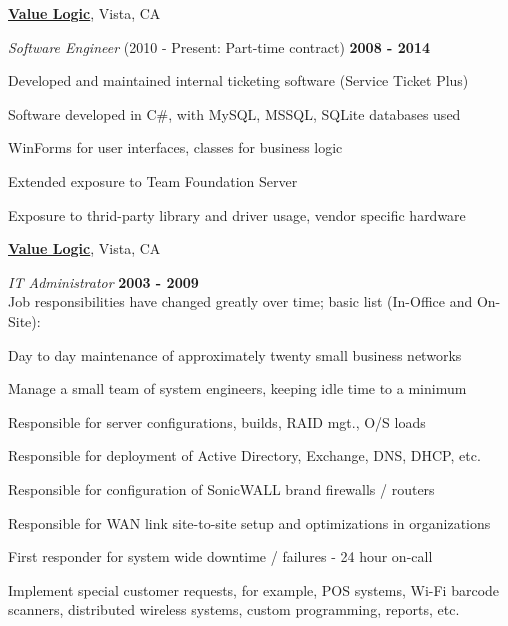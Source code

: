 \documentclass[10pt]{article}
\newcommand{\halfblankline}{\quad\vspace{-0.5\baselineskip}\pagebreak[3]}
\begin{document}
\href{http://www.valuelogic.com/}{\textbf{Value Logic}}, Vista, CA
\begin{outerlist}
  \item[] \textit{Software Engineer}
  \hfill (2010 - Present: Part-time contract)
  \hfill \textbf{2008 - 2014}
  \begin{innerlist}
  \item Developed and maintained internal ticketing software (Service Ticket Plus)
  \begin{innerlist}
    \item Software developed in C\#, with MySQL, MSSQL, SQLite databases used
    \item WinForms for user interfaces, classes for business logic
  \end{innerlist}
  \item Extended exposure to Team Foundation Server
  \item Exposure to thrid-party library and driver usage, vendor specific hardware
  \end{innerlist}
\end{outerlist}

\halfblankline

\href{http://www.valuelogic.com/}{\textbf{Value Logic}}, Vista, CA
\begin{outerlist}
  \item[] \textit{IT Administrator}
  \hfill \textbf{2003 - 2009}
  \\Job responsibilities have changed greatly over time; basic list (In-Office and On-Site):
  \begin{innerlist}
    \item Day to day maintenance of approximately twenty small business networks
    \item Manage a small team of system engineers, keeping idle time to a minimum
    \item Responsible for server configurations, builds, RAID mgt., O/S loads
    \item Responsible for deployment of Active Directory, Exchange, DNS, DHCP, etc.
    \item Responsible for configuration of SonicWALL brand firewalls / routers
    \item Responsible for WAN link site-to-site setup and optimizations in organizations
    \item First responder for system wide downtime / failures - 24 hour on-call
    \item Implement special customer requests, for example, POS systems, Wi-Fi barcode
    \\    scanners, distributed wireless systems, custom programming, reports, etc.
  \end{innerlist}
\end{outerlist}

\halfblankline
\end{document}
